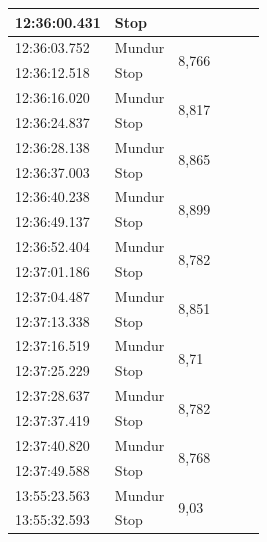 \begin{longtable}{|l|l|l|l|l|l|}
  \cline{1-2}
  12:36:00.431           & Stop                &             \\
  \hline
  12:36:03.752           & Mundur                & \multirow{2}{*}{8,766}           \\
  \cline{1-2}
  12:36:12.518           & Stop                &            \\
  \hline
  12:36:16.020           & Mundur                & \multirow{2}{*}{8,817}           \\
  \cline{1-2}
  12:36:24.837           & Stop                &            \\
  \hline
  12:36:28.138           & Mundur                & \multirow{2}{*}{8,865}           \\
  \cline{1-2}
  12:36:37.003           & Stop                &            \\
  \hline
  12:36:40.238           & Mundur                & \multirow{2}{*}{8,899}           \\  
  \cline{1-2}
  12:36:49.137           & Stop                &             \\
    \hline
  12:36:52.404           & Mundur                & \multirow{2}{*}{8,782}           \\
  \cline{1-2}
  12:37:01.186           & Stop                &            \\
  \hline
  12:37:04.487           & Mundur                & \multirow{2}{*}{8,851}           \\
  \cline{1-2}
  12:37:13.338           & Stop                &             \\
  \hline
  12:37:16.519           & Mundur                & \multirow{2}{*}{8,71}            \\
  \cline{1-2}
  12:37:25.229           & Stop                &             \\
  \hline
  12:37:28.637           & Mundur                & \multirow{2}{*}{8,782}           \\
  \cline{1-2}
  12:37:37.419           & Stop                &            \\
  \hline
  12:37:40.820           & Mundur                & \multirow{2}{*}{8,768}           \\
  \cline{1-2}
  12:37:49.588           & Stop                &            \\
  \hline
  13:55:23.563           & Mundur                & \multirow{2}{*}{9,03}           \\
  \cline{1-2}
  13:55:32.593           & Stop                &            \\  

\end{longtable}

